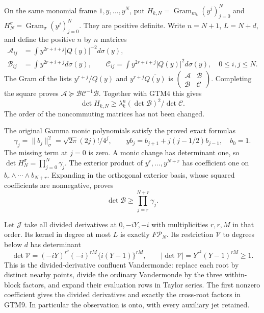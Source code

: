 On the same monomial frame $1,y,\ldots,y^N$, put
$H_{k,N}=\operatorname{Gram}_{m_k}(y^j)_{j=0}^N$ and
$H_N^\sigma=\operatorname{Gram}_\sigma(y^j)_{j=0}^N$.
They are positive definite.  Write $n=N+1$, $L=N+d$, and define
the positive $n$ by $n$ matrices
\begin{equation}\tag{GTM5}
 \begin{aligned}
 \mathcal A_{ij}&=\int y^{2r+i+j}|Q(y)|^{-2}d\sigma(y),\\
 \mathcal B_{ij}&=\int y^{2r+i+j}d\sigma(y),\qquad
 \mathcal C_{ij}=\int y^{2r+i+j}|Q(y)|^2d\sigma(y),
 \quad0\le i,j\le N.
 \end{aligned}
\end{equation}
The Gram of the lists $y^{r+j}/Q(y)$ and
$y^{r+j}\overline{Q(y)}$ is
$\left(\begin{smallmatrix}\mathcal A&\mathcal B\\
\mathcal B&\mathcal C\end{smallmatrix}\right)$.
Completing the square proves
$\mathcal A\succeq\mathcal B\mathcal C^{-1}\mathcal B$.
Together with GTM4 this gives
\begin{equation}\tag{GTM6}
 \det H_{k,N}\ge\lambda_k^n
             (\det\mathcal B)^2/\det\mathcal C.
\end{equation}
The order of the noncommuting matrices has not been changed.

The original Gamma monic polynomials satisfy the proved exact formulas
\begin{equation}\tag{GTM7}
 \gamma_j=\|b_j\|_\sigma^2
   =\sqrt{2\pi}(2j)!/4^j,\qquad
 yb_j=b_{j+1}+j(j-1/2)b_{j-1},\quad b_0=1.
\end{equation}
The missing term at $j=0$ is zero.  A monic change has determinant
one, so $\det H_N^\sigma=\prod_{j=0}^N\gamma_j$.
The exterior product of $y^r,\ldots,y^{N+r}$ has coefficient one
on $b_r\wedge\cdots\wedge b_{N+r}$.  Expanding in the orthogonal
exterior basis, whose squared coefficients are nonnegative, proves
\begin{equation}\tag{GTM8}
 \det\mathcal B\ge\prod_{j=r}^{N+r}\gamma_j.
\end{equation}

Let $\mathcal J$ take all divided derivatives at
$0,-iY,-i$ with multiplicities $r,r,M$ in that order.
Its kernel in degree at most $L$ is exactly $F\mathcal P_N$.
Its restriction $\mathcal V$ to degrees below $d$ has determinant
\begin{equation}\tag{GTM9}
 \det\mathcal V=(-iY)^{r^2}(-i)^{rM}\{i(Y-1)\}^{rM},
 \qquad |\det\mathcal V|=Y^{r^2}(Y-1)^{rM}\ge1.
\end{equation}
This is the divided-derivative confluent Vandermonde: replace each
root by distinct nearby points, divide the ordinary Vandermonde by
the three within-block factors, and expand their evaluation rows in
Taylor series.  The first nonzero coefficient gives the divided
derivatives and exactly the cross-root factors in GTM9.  In particular
the observation is onto, with every auxiliary jet retained.

